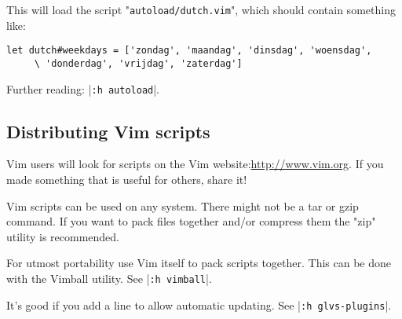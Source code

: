 This will load the script "\texttt{autoload/dutch.vim}", which should contain something like:

\begin{Verbatim}[samepage=true]
 let dutch#weekdays = ['zondag', 'maandag', 'dinsdag', 'woensdag',
     \ 'donderdag', 'vrijdag', 'zaterdag']
\end{Verbatim}

Further reading: |\texttt{:h autoload}|.
\subsection{Distributing Vim scripts}
\label{distribute-script}
Vim users will look for scripts on the Vim website:\url{http://www.vim.org}.
If you made something that is useful for others, share it!

Vim scripts can be used on any system.
There might not be a tar or gzip command.
If you want to pack files together and/or compress them the "zip" utility is recommended.

For utmost portability use Vim itself to pack scripts together.
This can be done with the Vimball utility.
See |\texttt{:h vimball}|.

It's good if you add a line to allow automatic updating.
See |\texttt{:h glvs-plugins}|.
\clearpage
